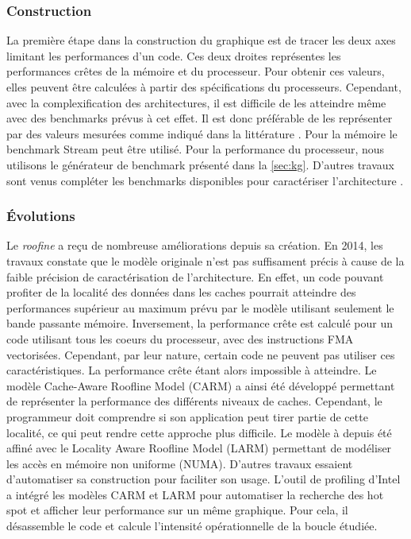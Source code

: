 \subsubsection{Construction}
La première étape dans la construction du graphique est de tracer les deux axes limitant les performances d’un code. Ces deux droites représentes les performances crêtes de la mémoire et du processeur. Pour obtenir ces valeurs, elles peuvent être calculées à partir des spécifications du processeurs. Cependant, avec la complexification des architectures, il est difficile de les atteindre même avec des benchmarks prévus à cet effet. Il est donc préférable de les représenter par des valeurs mesurées comme indiqué dans la littérature  \cite{farjallah2014preparing}. Pour la mémoire le benchmark Stream peut être utilisé. Pour la performance du processeur, nous utilisons le générateur de benchmark présenté dans la \autoref{sec:kg}. D’autres travaux sont venus compléter les benchmarks disponibles pour caractériser l’architecture \cite{lo2014roofline}.




\subsubsection{Évolutions}


Le \textit{roofine} a reçu de nombreuse améliorations depuis sa création. En 2014, les travaux \cite{Ilic2014} constate que le modèle originale n’est pas suffisament précis à cause de la faible précision de caractérisation de l’architecture. En effet, un code pouvant profiter de la localité des données dans les caches pourrait atteindre des performances supérieur au maximum prévu par le modèle utilisant seulement le bande passante mémoire. Inversement, la performance crête est calculé pour un code utilisant tous les coeurs du processeur, avec des instructions FMA vectorisées. Cependant, par leur nature, certain code ne peuvent pas utiliser ces  caractéristiques. La performance crête étant alors impossible à atteindre. Le modèle Cache-Aware Roofline Model (CARM) \cite{Ilic2014} a ainsi été développé permettant de représenter la performance des différents niveaux de caches. Cependant, le programmeur doit comprendre si son application peut tirer partie de cette localité, ce qui peut rendre cette approche plus difficile. Le modèle à depuis été affiné avec le Locality Aware Roofline Model (LARM) \cite{Denoyelle2018} permettant de modéliser les accès en mémoire non uniforme (NUMA).
D’autres travaux essaient d’automatiser sa construction \cite{lo2014roofline} pour faciliter son usage. L’outil de profiling d’Intel a intégré les modèles CARM et LARM pour automatiser la recherche des hot spot et afficher leur performance sur un même graphique. Pour cela, il désassemble le code et calcule l’intensité opérationnelle de la boucle étudiée.


